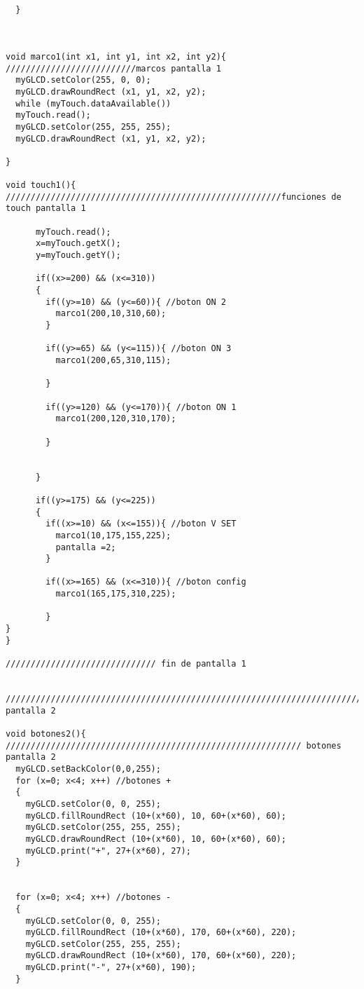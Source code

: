 \begin{verbatim}
  
  
  }
  
  
  
void marco1(int x1, int y1, int x2, int y2){ //////////////////////////marcos pantalla 1
  myGLCD.setColor(255, 0, 0);
  myGLCD.drawRoundRect (x1, y1, x2, y2);
  while (myTouch.dataAvailable())
  myTouch.read();
  myGLCD.setColor(255, 255, 255);
  myGLCD.drawRoundRect (x1, y1, x2, y2);
  
}

void touch1(){ ///////////////////////////////////////////////////////funciones de touch pantalla 1
  
      myTouch.read();
      x=myTouch.getX();
      y=myTouch.getY();

      if((x>=200) && (x<=310))
      {
        if((y>=10) && (y<=60)){ //boton ON 2
          marco1(200,10,310,60);
        }
        
        if((y>=65) && (y<=115)){ //boton ON 3
          marco1(200,65,310,115);

        }

        if((y>=120) && (y<=170)){ //boton ON 1
          marco1(200,120,310,170);
   
        }

       
      }

      if((y>=175) && (y<=225))
      {
        if((x>=10) && (x<=155)){ //boton V SET
          marco1(10,175,155,225);
          pantalla =2;
        }
      
        if((x>=165) && (x<=310)){ //boton config
          marco1(165,175,310,225);
          
        }
}
}

////////////////////////////// fin de pantalla 1


//////////////////////////////////////////////////////////////////////////// pantalla 2

void botones2(){ /////////////////////////////////////////////////////////// botones pantalla 2
  myGLCD.setBackColor(0,0,255);
  for (x=0; x<4; x++) //botones +
  {
    myGLCD.setColor(0, 0, 255);
    myGLCD.fillRoundRect (10+(x*60), 10, 60+(x*60), 60);
    myGLCD.setColor(255, 255, 255);
    myGLCD.drawRoundRect (10+(x*60), 10, 60+(x*60), 60);
    myGLCD.print("+", 27+(x*60), 27);
  }


  for (x=0; x<4; x++) //botones -
  {
    myGLCD.setColor(0, 0, 255);
    myGLCD.fillRoundRect (10+(x*60), 170, 60+(x*60), 220);
    myGLCD.setColor(255, 255, 255);
    myGLCD.drawRoundRect (10+(x*60), 170, 60+(x*60), 220);
    myGLCD.print("-", 27+(x*60), 190);
  }


\end{verbatim}
